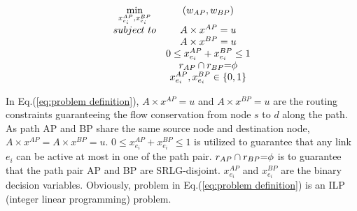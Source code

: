 \begin{equation}
\begin{array}{*{20}{c}}
    \min\limits_{x^{AP}_{e_i}, x^{BP}_{e_i}} & { \left( {w_{AP},w_{BP}} \right)}\\
   {subject\ to} & A\times x^{AP}=u  \\
   {} & A\times x^{BP}=u \\
   {} & 0 \leq x^{AP}_{e_i}+x^{BP}_{e_i}\leq 1\\
   {} & {r_{AP}} \cap {r_{BP}}{\rm{ = }}\phi \\
   {} & x^{AP}_{e_i}, x^{BP}_{e_i} \in {\rm{\{ 0,1\} }}
\end{array}
\label{eq:problem definition}
\end{equation}

In Eq.(\ref{eq:problem definition}),  $A\times x^{AP}=u$ and $A\times x^{BP}=u$ are the  routing constraints  guaranteeing the flow conservation from node $s$ to $d$ along the path. As path AP and BP share the same source node and destination node,  $A\times x^{AP}=A\times x^{BP}=u$.  $0 \leq x^{AP}_{e_i}+x^{BP}_{e_i}\leq 1$  is utilized to guarantee that any link $e_i$ can be active at most in one of the path pair. ${r_{AP}} \cap {r_{BP}}{\rm{ = }}\phi$ is  to guarantee that the path pair AP and BP are SRLG-disjoint. $x^{AP}_{e_i}$ and $x^{BP}_{e_i}$ are the  binary  decision  variables. Obviously,  problem in Eq.(\ref{eq:problem definition}) is an  ILP (integer linear programming) problem.

